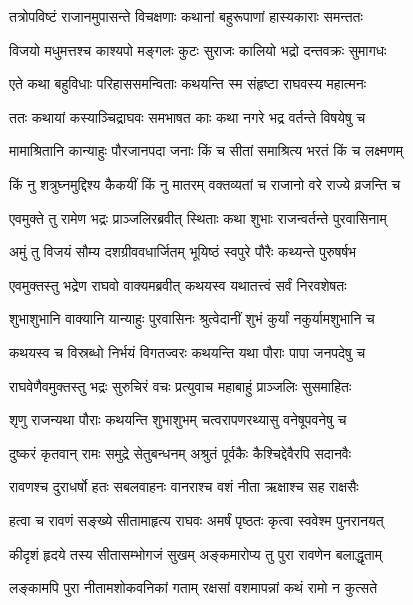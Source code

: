 
\twolineshloka
{तत्रोपविष्टं राजानमुपासन्ते विचक्षणाः}
{कथानां बहुरूपाणां हास्यकाराः समन्ततः} %

\twolineshloka
{विजयो मधुमत्तश्च काश्यपो मङ्गलः कुटः}
{सुराजः कालियो भद्रो दन्तवक्रः सुमागधः} %

\twolineshloka
{एते कथा बहुविधाः परिहाससमन्विताः}
{कथयन्ति स्म संहृष्टा राघवस्य महात्मनः} %

\twolineshloka
{ततः कथायां कस्याञ्चिद्राघवः समभाषत}
{काः कथा नगरे भद्र वर्तन्ते विषयेषु च} %

\twolineshloka
{मामाश्रितानि कान्याहुः पौरजानपदा जनाः}
{किं च सीतां समाश्रित्य भरतं किं च लक्ष्मणम्} %

\twolineshloka
{किं नु शत्रुघ्नमुद्दिश्य कैकयीं किं नु मातरम्}
{वक्तव्यतां च राजानो वरे राज्ये व्रजन्ति च} %

\twolineshloka
{एवमुक्ते तु रामेण भद्रः प्राञ्जलिरब्रवीत्}
{स्थिताः कथा शुभाः राजन्वर्तन्ते पुरवासिनाम्} %

\twolineshloka
{अमुं तु विजयं सौम्य दशग्रीववधार्जितम्}
{भूयिष्ठं स्वपुरे पौरैः कथ्यन्ते पुरुषर्षभ} %

\twolineshloka
{एवमुक्तस्तु भद्रेण राघवो वाक्यमब्रवीत्}
{कथयस्व यथातत्त्वं सर्वं निरवशेषतः} %

\twolineshloka
{शुभाशुभानि वाक्यानि यान्याहुः पुरवासिनः}
{श्रुत्वेदानीं शुभं कुर्यां नकुर्यामशुभानि च} %

\twolineshloka
{कथयस्व च विस्रब्धो निर्भयं विगतज्वरः}
{कथयन्ति यथा पौराः पापा जनपदेषु च} %

\twolineshloka
{राघवेणैवमुक्तस्तु भद्रः सुरुचिरं वचः}
{प्रत्युवाच महाबाहुं प्राञ्जलिः सुसमाहितः} %

\twolineshloka
{शृणु राजन्यथा पौराः कथयन्ति शुभाशुभम्}
{चत्वरापणरथ्यासु वनेषूपवनेषु च} %

\twolineshloka
{दुष्करं कृतवान् रामः समुद्रे सेतुबन्धनम्}
{अश्रुतं पूर्वकैः कैश्चिद्देवैरपि सदानवैः} %

\twolineshloka
{रावणश्च दुराधर्षो हतः सबलवाहनः}
{वानराश्च वशं नीता ऋक्षाश्च सह राक्षसैः} %

\twolineshloka
{हत्वा च रावणं सङ्ख्ये सीतामाहृत्य राघवः}
{अमर्षं पृष्ठतः कृत्वा स्ववेश्म पुनरानयत्} %

\twolineshloka
{कीदृशं हृदये तस्य सीतासम्भोगजं सुखम्}
{अङ्कमारोप्य तु पुरा रावणेन बलाद्धृताम्} %

\twolineshloka
{लङ्कामपि पुरा नीतामशोकवनिकां गताम्}
{रक्षसां वशमापन्नां कथं रामो न कुत्सते} %

